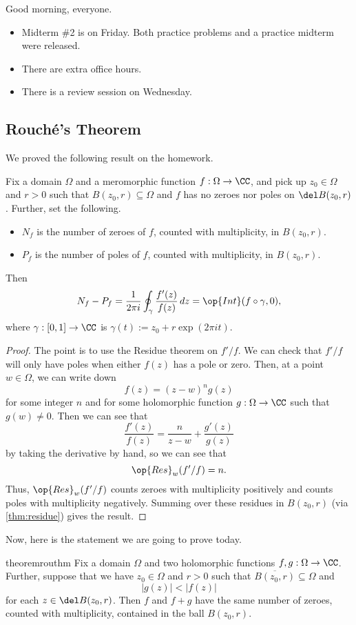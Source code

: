 
Good morning, everyone.
\begin{itemize}
	\item Midterm \#2 is on Friday. Both practice problems and a practice midterm were released.
	\item There are extra office hours.
	\item There is a review session on Wednesday.
\end{itemize}

\subsection{Rouch\'e's Theorem}
We proved the following result on the homework.
\begin{theorem} \label{thm:argpri}
	Fix a domain $\Omega$ and a meromorphic function $f:\Omega\to\CC$, and pick up $z_0\in\Omega$ and $r>0$ such that $B(z_0,r)\subseteq\Omega$ and $f$ has no zeroes nor poles on $\del B(z_0,r)$. Further, set the following.
	\begin{itemize}
		\item $N_f$ is the number of zeroes of $f$, counted with multiplicity, in $B(z_0,r)$.
		\item $P_f$ is the number of poles of $f$, counted with multiplicity, in $B(z_0,r)$.
	\end{itemize}
	Then
	\[N_f-P_f=\frac1{2\pi i}\oint_\gamma\frac{f'(z)}{f(z)}\,dz=\op{Int}(f\circ\gamma,0),\]
	where $\gamma:[0,1]\to\CC$ is $\gamma(t):=z_0+r\exp(2\pi it)$.
\end{theorem}
\begin{proof}
	The point is to use the Residue theorem on $f'/f$. We can check that $f'/f$ will only have poles when either $f(z)$ has a pole or zero. Then, at a point $w\in\Omega$, we can write down
	\[f(z)=(z-w)^ng(z)\]
	for some integer $n$ and for some holomorphic function $g:\Omega\to\CC$ such that $g(w)\ne0$. Then we can see that
	\[\frac{f'(z)}{f(z)}=\frac n{z-w}+\frac{g'(z)}{g(z)}\]
	by taking the derivative by hand, so we can see that
	\[\op{Res}_w(f'/f)=n.\]
	Thus, $\op{Res}_w(f'/f)$ counts zeroes with multiplicity positively and counts poles with multiplicity negatively. Summing over these residues in $B(z_0,r)$ (via \autoref{thm:residue}) gives the result.
\end{proof}
Now, here is the statement we are going to prove today.
\begin{restatable}[Rouch\'e's]{theorem}{routhm} \label{thm:rou}
	Fix a domain $\Omega$ and two holomorphic functions $f,g:\Omega\to\CC$. Further, suppose that we have $z_0\in\Omega$ and $r>0$ such that $\overline{B(z_0,r)}\subseteq\Omega$ and
	\[|g(z)|<|f(z)|\]
	for each $z\in\del B(z_0,r)$. Then $f$ and $f+g$ have the same number of zeroes, counted with multiplicity, contained in the ball $B(z_0,r)$.
\end{restatable}

